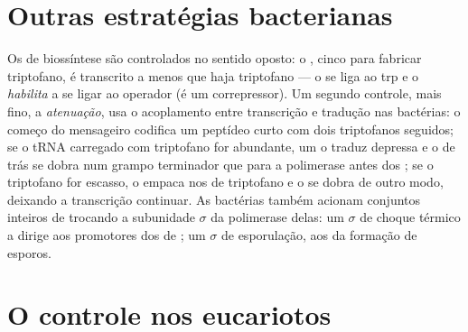 \section{Outras estratégias bacterianas}

\begin{proposition}\label{prop:b1:expression-control:trp}
Os  de biossíntese são controlados no sentido oposto: o
\emph{}, cinco  para fabricar triptofano, é transcrito a
menos que haja triptofano --- o  se liga ao  trp e o
\emph{habilita} a se ligar ao operador (é um correpressor). Um segundo
controle, mais fino, a \emph{atenuação}, usa o acoplamento entre
transcrição e tradução nas bactérias: o começo do mensageiro codifica um
peptídeo curto com dois triptofanos seguidos; se o tRNA carregado com
triptofano for abundante, um  o traduz depressa e o  de trás
se dobra num grampo terminador que para a polimerase antes dos ; se
o triptofano for escasso, o  empaca nos  de triptofano e
o  se dobra de outro modo, deixando a transcrição continuar. As
bactérias também acionam conjuntos inteiros de  trocando a
subunidade $\sigma$ da polimerase delas: um $\sigma$ de choque térmico a
dirige aos promotores dos  de ; um $\sigma$ de
esporulação, aos da formação de esporos.
\end{proposition}

\section{O controle nos eucariotos}

